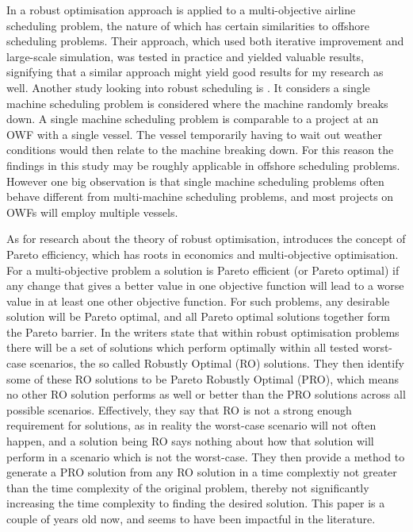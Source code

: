 \documentclass[a4paper,12pt]{article}
\begin{document}
In \cite{burke2010multi} a robust optimisation approach is applied to a multi-objective airline scheduling problem, the nature of which has certain similarities to offshore scheduling problems. Their approach, which used both iterative improvement and large-scale simulation, was tested in practice and yielded valuable results, signifying that a similar approach might yield good results for my research as well. 
Another study looking into robust scheduling is \cite{goren2008robustness}. It considers a single machine scheduling problem is considered where the machine randomly breaks down. A single machine scheduling problem is comparable to a project at an OWF with a single vessel. The vessel temporarily having to wait out weather conditions would then relate to the machine breaking down. For this reason the findings in this study may be roughly applicable in offshore scheduling problems. However one big observation is that single machine scheduling problems often behave different from multi-machine scheduling problems, and most projects on OWFs will employ multiple vessels. 

As for research about the theory of robust optimisation, \cite{iancu2013pareto} introduces the concept of Pareto efficiency, which has roots in economics and multi-objective optimisation. For a multi-objective problem a solution is Pareto efficient (or Pareto optimal) if any change that gives a better value in one objective function will lead to a worse value in at least one other objective function. For such problems, any desirable solution will be Pareto optimal, and all Pareto optimal solutions together form the Pareto barrier. In \cite{iancu2013pareto} the writers state that within robust optimisation problems there will be a set of solutions which perform optimally within all tested worst-case scenarios, the so called Robustly Optimal (RO) solutions. They then identify some of these RO solutions to be Pareto Robustly Optimal (PRO), which means no other RO solution performs as well or better than the PRO solutions across all possible scenarios. Effectively, they say that RO is not a strong enough requirement for solutions, as in reality the worst-case scenario will not often happen, and a solution being RO says nothing about how that solution will perform in a scenario which is not the worst-case. They then provide a method to generate a PRO solution from any RO solution in a time complextiy not greater than the time complexity of the original problem, thereby not significantly increasing the time complexity to finding the desired solution. This paper is a couple of years old now, and seems to have been impactful in the literature. 
\end{document}
